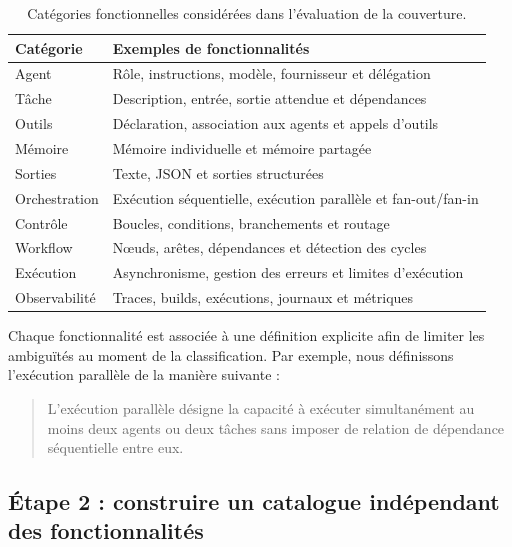 \begin{table}[t]
    \centering
    \caption{Catégories fonctionnelles considérées dans l'évaluation de la couverture.}
    \label{tab:perimetre-fonctionnel}
    \small
    \begin{tabularx}{\columnwidth}{@{}p{}>{\raggedright\arraybackslash}X@{}}
        \toprule
        \textbf{Catégorie} & \textbf{Exemples de fonctionnalités} \\
        \midrule
        Agent & Rôle, instructions, modèle, fournisseur et délégation \\
        Tâche & Description, entrée, sortie attendue et dépendances \\
        Outils & Déclaration, association aux agents et appels d'outils \\
        Mémoire & Mémoire individuelle et mémoire partagée \\
        Sorties & Texte, JSON et sorties structurées \\
        Orchestration & Exécution séquentielle, exécution parallèle et fan-out/fan-in \\
        Contrôle & Boucles, conditions, branchements et routage \\
        Workflow & Nœuds, arêtes, dépendances et détection des cycles \\
        Exécution & Asynchronisme, gestion des erreurs et limites d'exécution \\
        Observabilité & Traces, builds, exécutions, journaux et métriques \\
        \bottomrule
    \end{tabularx}
\end{table}

Chaque fonctionnalité est associée à une définition explicite afin de
limiter les ambiguïtés au moment de la classification. Par exemple,
nous définissons l'exécution parallèle de la manière suivante :

\begin{quote}
L'exécution parallèle désigne la capacité à exécuter simultanément au
moins deux agents ou deux tâches sans imposer de relation de dépendance
séquentielle entre eux.
\end{quote}


\subsection{Étape 2 : construire un catalogue indépendant des fonctionnalités}
\label{subsec:catalogue-fonctionnalites}


